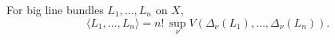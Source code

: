 \begin{theorem}\label{thm:ok-mvob-line-bundles}
For big line bundles \(L_1,\ldots,L_n\) on \(X\),
\[
 \langle L_1,\dots,L_n\rangle
 =n!\,\sup_\nu V\!\left(
     \Delta_\nu(L_1),\dots,\Delta_\nu(L_n)\right).
\tag{55.49}\label{eq:ok-mvob-line-bundles}
\]
\end{theorem}
